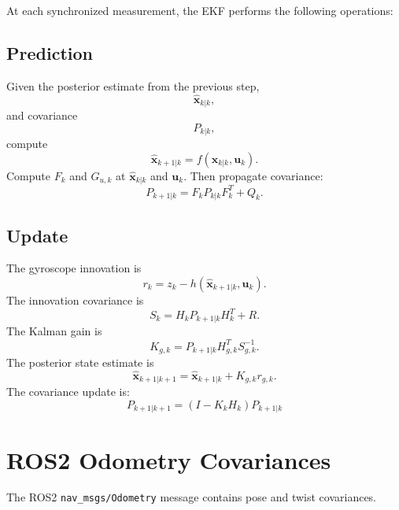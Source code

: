 \documentclass[11pt]{article}
\begin{document}
At each synchronized measurement, the EKF performs the following
operations:

\subsection{Prediction}

Given the posterior estimate from the previous step,
\begin{equation}
\hat{\mathbf{x}}_{k|k},
\end{equation}
and covariance
\begin{equation}
P_{k|k},
\end{equation}
compute
\begin{equation}
\hat{\mathbf{x}}_{k+1|k}
=
f(\hat{\mathbf{x}}_{k|k},\mathbf{u}_k).
\end{equation}
Compute $F_k$ and $G_{u,k}$ at
$\hat{\mathbf{x}}_{k|k}$ and $\mathbf{u}_k$. Then propagate covariance:
\begin{equation}
P_{k+1|k}
=
F_k
P_{k|k}
F_k^T
+
Q_k.
\end{equation}

\subsection{Update}

The gyroscope innovation is
\begin{equation}
r_k
=
z_k
-
h(\hat{\mathbf{x}}_{k+1|k},\mathbf{u}_k).
\end{equation}
The innovation covariance is
\begin{equation}
S_k
=
H_k
P_{k+1|k}
H_k^{T}
+
R.
\end{equation}
The Kalman gain is
\begin{equation}
K_{g,k}
=
P_{k+1|k}
H_{g,k}^{T}
S_{g,k}^{-1}.
\end{equation}
The posterior state estimate is
\begin{equation}
\hat{\mathbf{x}}_{k+1|k+1}
=
\hat{\mathbf{x}}_{k+1|k}
+
K_{g,k}r_{g,k}.
\end{equation}
The covariance update is:
\begin{equation}
P_{k+1|k+1}
=
(I-K_kH_k)
P_{k+1|k}
\end{equation}

\section{ROS2 Odometry Covariances}

The ROS2 \texttt{nav\_msgs/Odometry} message contains pose and twist
covariances.
\end{document}
